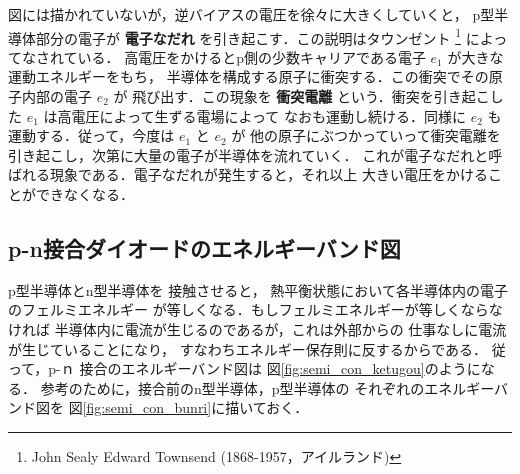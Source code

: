         図には描かれていないが，逆バイアスの電圧を徐々に大きくしていくと，
        p型半導体部分の電子が {\bf 電子なだれ} を引き起こす．この説明はタウンゼント
            \footnote{
                John Sealy Edward Townsend (1868-1957，アイルランド)
            }
        によってなされている．
        高電圧をかけるとp側の少数キャリアである電子 $e_{1}$ が大きな運動エネルギーをもち，
        半導体を構成する原子に衝突する．この衝突でその原子内部の電子 $e_{2}$ が
        飛び出す．この現象を {\bf 衝突電離} という．衝突を引き起こした $e_{1}$ は高電圧によって生ずる電場によって
        なおも運動し続ける．同様に $e_{2}$ も運動する．従って，今度は $e_{1}$ と $e_{2}$ が
        他の原子にぶつかっていって衝突電離を引き起こし，次第に大量の電子が半導体を流れていく．
        これが電子なだれと呼ばれる現象である．電子なだれが発生すると，それ以上
        大きい電圧をかけることができなくなる．

        \subsection{p-n接合ダイオードのエネルギーバンド図}
        p型半導体とn型半導体を
        接触させると，
        熱平衡状態において各半導体内の電子のフェルミエネルギー
        が等しくなる．もしフェルミエネルギーが等しくならなければ
        半導体内に電流が生じるのであるが，これは外部からの
        仕事なしに電流が生じていることになり，
        すなわちエネルギー保存則に反するからである．
        従って，p-ｎ 接合のエネルギーバンド図は
        図\ref{fig:semi_con_ketugou}のようになる．
        参考のために，接合前のn型半導体，p型半導体の
        それぞれのエネルギーバンド図を
        図\ref{fig:semi_con_bunri}に描いておく．


